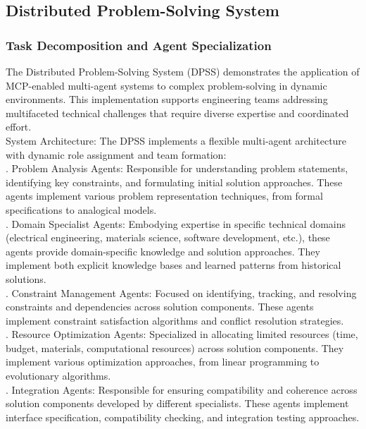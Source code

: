 \subsection{Distributed Problem-Solving System}
\subsubsection{Task Decomposition and Agent Specialization}
The Distributed Problem-Solving System (DPSS) demonstrates the application of MCP-enabled multi-agent systems to complex problem-solving in dynamic environments. This implementation supports engineering teams addressing multifaceted technical challenges that require diverse expertise and coordinated effort.\\ \newline
System Architecture: The DPSS implements a flexible multi-agent architecture with dynamic role assignment and team formation:\\ . Problem Analysis Agents: Responsible for understanding problem statements, identifying key constraints, and formulating initial solution approaches. These agents implement various problem representation techniques, from formal specifications to analogical models.\\ . Domain Specialist Agents: Embodying expertise in specific technical domains (electrical engineering, materials science, software development, etc.), these agents provide domain-specific knowledge and solution approaches. They implement both explicit knowledge bases and learned patterns from historical solutions.\\ . Constraint Management Agents: Focused on identifying, tracking, and resolving constraints and dependencies across solution components. These agents implement constraint satisfaction algorithms and conflict resolution strategies.\\ . Resource Optimization Agents: Specialized in allocating limited resources (time, budget, materials, computational resources) across solution components. They implement various optimization approaches, from linear programming to evolutionary algorithms.\\ . Integration Agents: Responsible for ensuring compatibility and coherence across solution components developed by different specialists. These agents implement interface specification, compatibility checking, and integration testing approaches.\\ \newline
